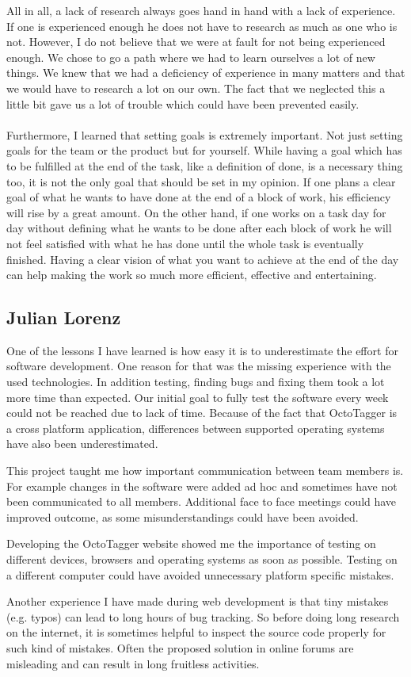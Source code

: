 All in all, a lack of research always goes hand in hand with a lack of experience. If one is experienced enough he does not have to research as much as one who is not. However, I do not believe that we were at fault for not being experienced enough. We chose to go a path where we had to learn ourselves a lot of new things. We knew that we had a deficiency of experience in many matters and that we would have to research a lot on our own. The fact that we neglected this a little bit gave us a lot of trouble which could have been prevented easily.

\paragraph{}
Furthermore, I learned that setting goals is extremely important. Not just setting goals for the team or the product but for yourself. While having a goal which has to be fulfilled at the end of the task, like a definition of done, is a necessary thing too, it is not the only goal that should be set in my opinion. If one plans a clear goal of what he wants to have done at the end of a block of work, his efficiency will rise by a great amount. On the other hand, if one works on a task day for day without defining what he wants to be done after each block of work he will not feel satisfied with what he has done until the whole task is eventually finished. Having a clear vision of what you want to achieve at the end of the day can help making the work so much more efficient, effective and entertaining.

\subsection{Julian Lorenz}

One of the lessons I have learned is how easy it is to underestimate the effort for software development. One reason for that was the missing experience with the used technologies. In addition testing, finding bugs and fixing them took a lot more time than expected. Our initial goal to fully test the software every week could not be reached due to lack of time. Because of the fact that OctoTagger is a cross platform application, differences between supported operating systems have also been underestimated.

This project taught me how important communication between team members is. For example changes in the software were added ad hoc and sometimes have not been communicated to all members. Additional face to face meetings could have improved outcome, as some misunderstandings could have been avoided.

Developing the OctoTagger website showed me the importance of testing on different devices, browsers and operating systems as soon as possible. Testing on a different computer could have avoided unnecessary platform specific mistakes.

Another experience I have made during web development is that tiny mistakes (e.g. typos) can lead to long hours of bug tracking. So before doing long research on the internet, it is sometimes helpful to inspect the source code properly for such kind of mistakes. Often the proposed solution in online forums are misleading and can result in long fruitless activities.
